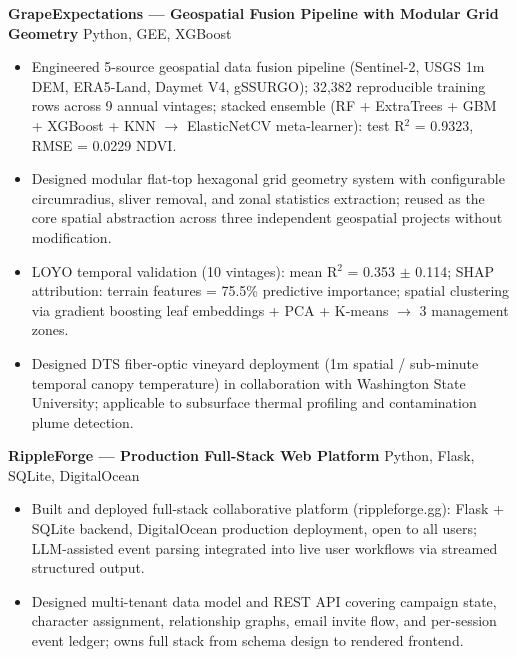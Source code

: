 \documentclass[11pt,a4paper]{article}
\begin{document}
\vspace{0.2cm}
\noindent
\textbf{GrapeExpectations --- Geospatial Fusion Pipeline with Modular Grid Geometry} \hfill Python, GEE, XGBoost
\begin{itemize}
    \item Engineered 5-source geospatial data fusion pipeline (Sentinel-2, USGS 1m DEM, ERA5-Land, Daymet V4, gSSURGO); 32,382 reproducible training rows across 9 annual vintages; stacked ensemble (RF + ExtraTrees + GBM + XGBoost + KNN $\rightarrow$ ElasticNetCV meta-learner): test R$^2$ = 0.9323, RMSE = 0.0229 NDVI.
    \item Designed modular flat-top hexagonal grid geometry system with configurable circumradius, sliver removal, and zonal statistics extraction; reused as the core spatial abstraction across three independent geospatial projects without modification.
    \item LOYO temporal validation (10 vintages): mean R$^2$ = 0.353 $\pm$ 0.114; SHAP attribution: terrain features = 75.5\% predictive importance; spatial clustering via gradient boosting leaf embeddings + PCA + K-means $\rightarrow$ 3 management zones.
    \item Designed DTS fiber-optic vineyard deployment (1m spatial / sub-minute temporal canopy temperature) in collaboration with Washington State University; applicable to subsurface thermal profiling and contamination plume detection.
\end{itemize}

\vspace{0.2cm}
\noindent
\textbf{RippleForge --- Production Full-Stack Web Platform} \hfill Python, Flask, SQLite, DigitalOcean
\begin{itemize}
    \item Built and deployed full-stack collaborative platform (rippleforge.gg): Flask + SQLite backend, DigitalOcean production deployment, open to all users; LLM-assisted event parsing integrated into live user workflows via streamed structured output.
    \item Designed multi-tenant data model and REST API covering campaign state, character assignment, relationship graphs, email invite flow, and per-session event ledger; owns full stack from schema design to rendered frontend.
\end{itemize}
\end{document}
